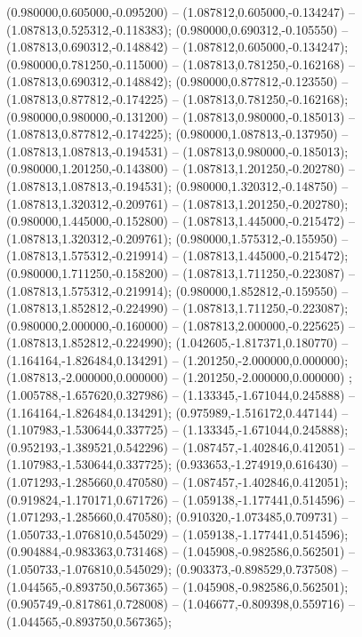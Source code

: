 (0.980000,0.605000,-0.095200) -- (1.087812,0.605000,-0.134247) -- (1.087813,0.525312,-0.118383);
 (0.980000,0.690312,-0.105550) -- (1.087813,0.690312,-0.148842) -- (1.087812,0.605000,-0.134247);
 (0.980000,0.781250,-0.115000) -- (1.087813,0.781250,-0.162168) -- (1.087813,0.690312,-0.148842);
 (0.980000,0.877812,-0.123550) -- (1.087813,0.877812,-0.174225) -- (1.087813,0.781250,-0.162168);
 (0.980000,0.980000,-0.131200) -- (1.087813,0.980000,-0.185013) -- (1.087813,0.877812,-0.174225);
 (0.980000,1.087813,-0.137950) -- (1.087813,1.087813,-0.194531) -- (1.087813,0.980000,-0.185013);
 (0.980000,1.201250,-0.143800) -- (1.087813,1.201250,-0.202780) -- (1.087813,1.087813,-0.194531);
 (0.980000,1.320312,-0.148750) -- (1.087813,1.320312,-0.209761) -- (1.087813,1.201250,-0.202780);
 (0.980000,1.445000,-0.152800) -- (1.087813,1.445000,-0.215472) -- (1.087813,1.320312,-0.209761);
 (0.980000,1.575312,-0.155950) -- (1.087813,1.575312,-0.219914) -- (1.087813,1.445000,-0.215472);
 (0.980000,1.711250,-0.158200) -- (1.087813,1.711250,-0.223087) -- (1.087813,1.575312,-0.219914);
 (0.980000,1.852812,-0.159550) -- (1.087813,1.852812,-0.224990) -- (1.087813,1.711250,-0.223087);
 (0.980000,2.000000,-0.160000) -- (1.087813,2.000000,-0.225625) -- (1.087813,1.852812,-0.224990);
 (1.042605,-1.817371,0.180770) -- (1.164164,-1.826484,0.134291) -- (1.201250,-2.000000,0.000000);
 (1.087813,-2.000000,0.000000) -- (1.201250,-2.000000,0.000000) ;
 (1.005788,-1.657620,0.327986) -- (1.133345,-1.671044,0.245888) -- (1.164164,-1.826484,0.134291);
 (0.975989,-1.516172,0.447144) -- (1.107983,-1.530644,0.337725) -- (1.133345,-1.671044,0.245888);
 (0.952193,-1.389521,0.542296) -- (1.087457,-1.402846,0.412051) -- (1.107983,-1.530644,0.337725);
 (0.933653,-1.274919,0.616430) -- (1.071293,-1.285660,0.470580) -- (1.087457,-1.402846,0.412051);
 (0.919824,-1.170171,0.671726) -- (1.059138,-1.177441,0.514596) -- (1.071293,-1.285660,0.470580);
 (0.910320,-1.073485,0.709731) -- (1.050733,-1.076810,0.545029) -- (1.059138,-1.177441,0.514596);
 (0.904884,-0.983363,0.731468) -- (1.045908,-0.982586,0.562501) -- (1.050733,-1.076810,0.545029);
 (0.903373,-0.898529,0.737508) -- (1.044565,-0.893750,0.567365) -- (1.045908,-0.982586,0.562501);
 (0.905749,-0.817861,0.728008) -- (1.046677,-0.809398,0.559716) -- (1.044565,-0.893750,0.567365);

